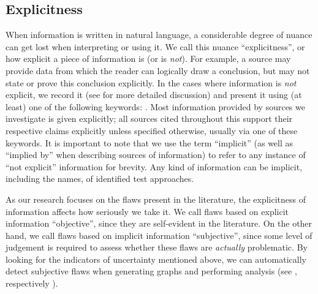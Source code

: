 \subsection{Explicitness}\label{explicitness}

When information is written in natural language, a considerable degree of
nuance can get lost when interpreting or using it. We call this nuance
``explicitness'', or how explicit a piece of information is (or is \emph{not}).
For example, a source may provide data from which the reader can logically draw
a conclusion, but may not state or prove this conclusion explicitly. In the
cases where information is \emph{not} explicit, we record it (see
 for more detailed discussion) and present it using (at least)
one of the following keywords: \impKeywords{}. Most information provided
by sources we investigate is given explicitly; all sources cited throughout
this \docType{} support their respective claims explicitly unless specified
otherwise, usually via one of these keywords. It is important to note that we
use the term ``implicit'' (as well as ``implied by'' when describing sources of
information) to refer to any instance of ``not explicit'' information for
brevity. Any kind of information can be implicit, including the names,
\approachFields{} of identified test approaches.

As our research focuses on the flaws present in the literature, the
explicitness of information affects how seriously we take it. We call flaws
based on explicit information ``objective'', since they are self-evident in
the literature. On the other hand, we call flaws based on implicit information
``subjective'', since some level of judgement is required to assess whether
these flaws are \emph{actually} problematic. By looking for
the indicators of uncertainty mentioned above, we can
automatically detect subjective flaws when generating graphs and performing
analysis (see \ifnotpaper {}, respectively\else
    \fi).

